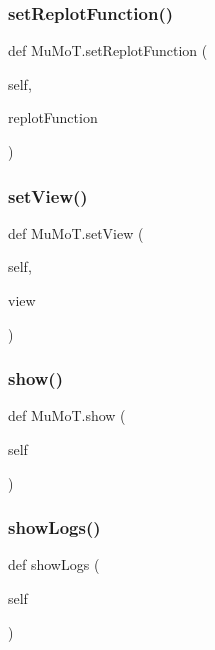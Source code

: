\mbox{\label{namespace_mu_mo_t_a74fe87995d70867d5327558b573a7663}} 
\subsubsection{\texorpdfstring{set\+Replot\+Function()}{setReplotFunction()}}
{\footnotesize\ttfamily def Mu\+Mo\+T.\+set\+Replot\+Function (\begin{DoxyParamCaption}\item[{}]{self,  }\item[{}]{replot\+Function }\end{DoxyParamCaption})}

\mbox{\label{namespace_mu_mo_t_a5581723fe21a31b8c96cd4ed5e801b97}} 
\subsubsection{\texorpdfstring{set\+View()}{setView()}}
{\footnotesize\ttfamily def Mu\+Mo\+T.\+set\+View (\begin{DoxyParamCaption}\item[{}]{self,  }\item[{}]{view }\end{DoxyParamCaption})}

\mbox{\label{namespace_mu_mo_t_a9e566211156997421188fcbf31c9af64}} 
\subsubsection{\texorpdfstring{show()}{show()}}
{\footnotesize\ttfamily def Mu\+Mo\+T.\+show (\begin{DoxyParamCaption}\item[{}]{self }\end{DoxyParamCaption})}

\mbox{\label{namespace_mu_mo_t_aca4d648d909f4722c7e07197675500bb}} 
\subsubsection{\texorpdfstring{show\+Logs()}{showLogs()}}
{\footnotesize\ttfamily def show\+Logs (\begin{DoxyParamCaption}\item[{}]{self }\end{DoxyParamCaption})}

